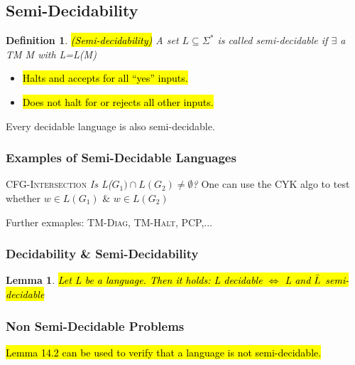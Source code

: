 \documentclass[a3paper, 8pt]{extarticle}
\newtheorem{lemma}[theorem]{Lemma}
\newtheorem*{definition}{Definition}
\begin{document}
\begin{multicols*}{6}
\subsection{Semi-Decidability}

\begin{definition}
    \hl{(Semi-decidability)} A set $L \subseteq \Sigma^*$ is called semi-decidable if $\exists$ a TM M with L=L(M)
\end{definition}

\begin{itemize}
    \item \hl{Halts and accepts for all “yes” inputs.}
    \item \hl{Does not halt for or rejects all other inputs.}
\end{itemize}

Every decidable language is also semi-decidable.

\subsubsection{ Examples of Semi-Decidable Languages}
\textsc{CFG-Intersection} \textit{Is L($G_1) \cap L(G_2)\neq \emptyset$?}
One can use the \textsc{CYK} algo to test whether $w \in L(G_1)$ \& $w \in L(G_2)$

Further exmaples: \textsc{TM-Diag, TM-Halt, PCP,...}

\subsubsection{ Decidability \& Semi-Decidability}

\begin{lemma}
    \hl{Let L be a language. Then it holds:
    L decidable $\iff$ L and $\Bar{L}$ semi-decidable}
\end{lemma}
\subsubsection{Non Semi-Decidable Problems}
\hl{Lemma 14.2 can be used to verify that a language is not semi-decidable.}


\end{multicols*}
\end{document}
